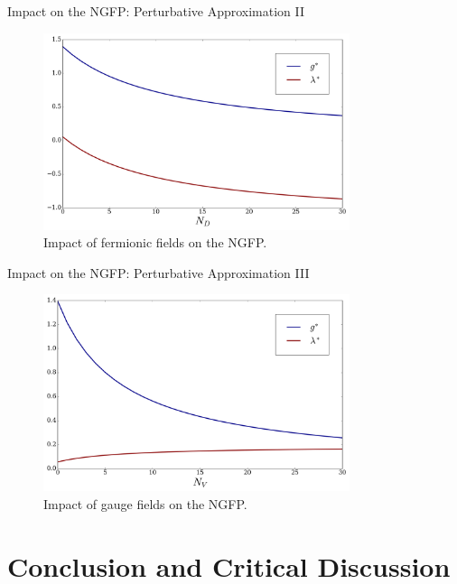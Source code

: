 \documentclass{beamer}
\begin{document}
\begin{frame}{Impact on the NGFP: Perturbative Approximation II}
	 \begin{figure}[H]
 \centering
 	\includegraphics[width= 0.8\textwidth]{figures/FP_fermions}
 	 \caption{Impact of fermionic fields on the NGFP.}	
 \end{figure}
\end{frame}

\begin{frame}{Impact on the NGFP: Perturbative Approximation III}
	 \begin{figure}[H]
 \centering
 	\includegraphics[width= 0.8\textwidth]{figures/FP_gauge}
 	 \caption{Impact of gauge fields on the NGFP.}	
 \end{figure}
\end{frame}

\section{Conclusion and Critical Discussion}
\end{document}
